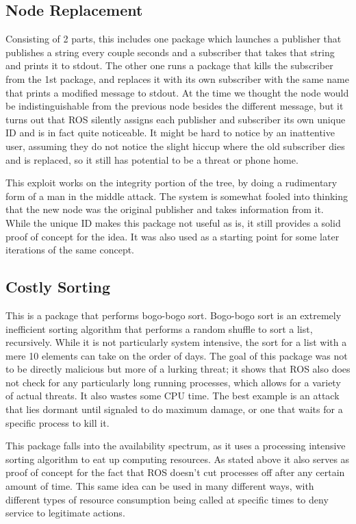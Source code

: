 \documentclass[IEEEtran,letterpaper,10pt,notitlepage,draftclsnofoot]{article}
\begin{document}
\subsection{Node Replacement}
Consisting of 2 parts, this includes one package which launches a publisher that publishes a string every couple seconds and a 
subscriber that takes that string and prints it to stdout.
The other one runs a package that kills the subscriber from the 1st package, and replaces it with its own subscriber with the 
same name that prints a modified message to stdout.
At the time we thought the node would be indistinguishable from the previous node besides the different message, but it turns 
out that ROS silently assigns each publisher and subscriber its own unique ID and is in fact quite noticeable.
It might be hard to notice by an inattentive user, assuming they do not notice the slight hiccup where the old subscriber dies 
and is replaced, so it still has potential to be a threat or phone home.

This exploit works on the integrity portion of the tree, by doing a rudimentary form of a man in the middle attack.
The system is somewhat fooled into thinking that the new node was the original publisher and takes information from it.
While the unique ID makes this package not useful as is, it still provides a solid proof of concept for the idea. 
It was also used as a starting point for some later iterations of the same concept. 

\subsection{Costly Sorting}
This is a package that performs bogo-bogo sort. \cite{bogo}
Bogo-bogo sort is an extremely inefficient sorting algorithm that performs a random shuffle to sort a list, recursively.
While it is not particularly system intensive, the sort for a list with a mere 10 elements can take on the order of days.
The goal of this package was not to be directly malicious but more of a lurking threat; it shows that ROS also does not check 
for any particularly long running processes, which allows for a variety of actual threats. It also wastes some CPU time.
The best example is an attack that lies dormant until signaled to do maximum damage, or one that waits for a specific process 
to kill it.

This package falls into the availability spectrum, as it uses a processing intensive sorting algorithm to eat up computing resources.
As stated above it also serves as proof of concept for the fact that ROS doesn't cut processes off after any certain amount of time.
This same idea can be used in many different ways, with different types of resource consumption being called at specific times to deny service to legitimate actions.
\end{document}
